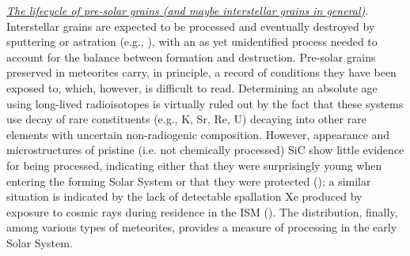 \documentclass{iau}
\begin{document}
{\underline{\it The lifecycle of pre-solar grains (and maybe interstellar grains in general)}}. Interstellar grains
are expected to be processed and eventually destroyed by sputtering or astration (e.g.,
\cite[Draine 2003]{Draine03}), with an as yet unidentified process needed to account for the balance between
formation and destruction. Pre-solar grains preserved in meteorites carry, in principle, a
record of conditions they have been exposed to, which, however, is difficult to read.
Determining an absolute age using long-lived radioisotopes is virtually ruled out by the fact
that these systems use decay of rare constituents (e.g., K, Sr, Re, U) decaying into other rare
elements with uncertain non-radiogenic composition. However, appearance and
microstructures of pristine (i.e. not chemically processed) SiC show little evidence for being
processed, indicating either that they were surprisingly young when entering the forming
Solar System or that they were protected 
(\cite[Bernatowicz et al. 2003]{Bernatowicz_etal03}); a similar situation is
indicated by the lack of detectable spallation Xe produced by exposure to cosmic rays during residence in the ISM 
(\cite[Ott et al.  2005]{Ott_etal05}). The distribution, finally, among various types of
meteorites, provides a measure of processing in the early Solar System.
\end{document}
